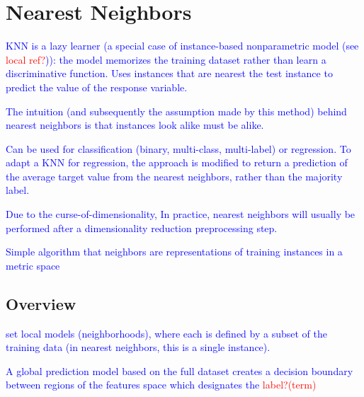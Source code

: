 \section{Nearest Neighbors}
\label{nearest_neighbors}

\textcolor{blue}{KNN is a lazy learner (a special case of instance-based nonparametric model (see \textcolor{red}{local ref?})): the model memorizes the training dataset rather than learn a discriminative function. Uses instances that are nearest the test instance to predict the value of the response variable.}

\textcolor{blue}{The intuition (and subsequently the assumption made by this method) behind nearest neighbors is that instances look alike must be alike.}

\textcolor{blue}{Can be used for classification (binary, multi-class, multi-label) or regression. To adapt a KNN for regression, the approach is modified to return a prediction of the average target value from the nearest neighbors, rather than the majority label.}

\textcolor{blue}{Due to the curse-of-dimensionality, In practice, nearest neighbors will usually be performed after a dimensionality reduction preprocessing step.}





\textcolor{blue}{Simple algorithm that neighbors are representations of training instances in a metric space}

\subsection{Overview}



\textcolor{blue}{set local models (neighborhoods), where each is defined by a subset of the training data (in nearest neighbors, this is a single instance).}

\textcolor{blue}{A global prediction model based on the full dataset creates a decision boundary between regions of the features space which designates the \textcolor{red}{label?(term)}}

